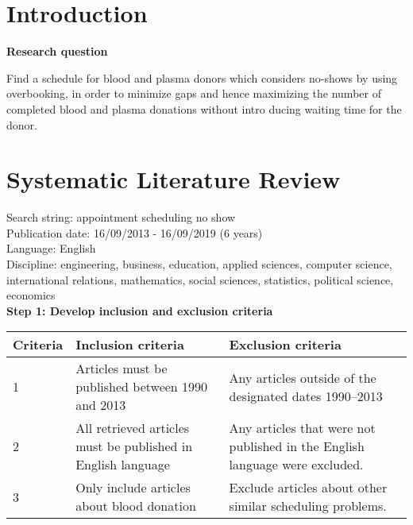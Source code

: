 \documentclass[a4paper,12pt]{article}
\begin{document}
\thispagestyle{empty}
\newpage
\tableofcontents
\setcounter{page}{1}


\section*{Introduction}



\textbf{Research question}

\bigbreak

Find a schedule for blood and plasma donors which considers no-shows by using overbooking, in order to minimize gaps and hence maximizing the number of completed blood and plasma donations without intro  ducing waiting time for the donor.

\section*{Systematic Literature Review}

Search string: appointment scheduling no show \\
Publication date: 16/09/2013 - 16/09/2019 (6 years) \\
Language: English \\
Discipline: engineering, business, education, applied sciences, computer science, international relations, mathematics, social sciences, statistics, political science, economics \\

\textbf{Step 1: Develop inclusion and exclusion criteria}

\begin{table}[H]
\begin{tabular}{@{}lll@{}}
\toprule
Criteria & Inclusion criteria & Exclusion criteria \\ \midrule
1        &    Articles must be published between 1990 and 2013                 &   Any articles outside of the designated dates 1990–2013                   \\
2        &      All retrieved articles must be published in English language              &   Any articles that were not published in the English language were excluded.                 \\
3     &  Only include articles about blood donation & Exclude articles about other similar scheduling problems. \\
\bottomrule
\end{tabular}
\end{table}
\end{document}
